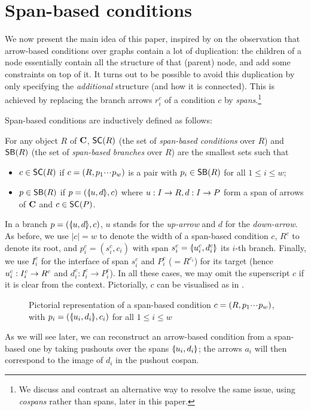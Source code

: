 \section{Span-based conditions}

We now present the main idea of this paper, inspired by on the observation that arrow-based conditions over graphs contain a lot of duplication: the children of a node essentially contain all the structure of that (parent) node, and add some constraints on top of it. It turns out to be possible to avoid this duplication by only specifying the \emph{additional} structure (and how it is connected). This is achieved by replacing the branch arrows $r^c_i$ of a condition $c$ by \emph{spans}.\footnote{We discuss and contrast an alternative way to resolve the same issue, using \emph{cospans} rather than spans, later in this paper.}

Span-based conditions are inductively defined as follows:

\begin{definition}
  For any object $R$ of $\mathbf{C}$, $\SC R$ (the set of \emph{span-based conditions} over $R$) and $\SB R$ (the set of \emph{span-based branches} over $R$) are the smallest sets such that
  \begin{itemize}
  \item $c\in \SC R$ if $c=(R,p_1{\cdotp\mkern-2mu\cdotp\mkern-2mu\cdotp\mkern1mu} p_w)$ is a pair with $p_i\in \SB R$ for all $1\leq i\leq w$;
  \item $p\in \SB R$ if $p=(\spanof u d,c)$ where $u: I\to R, d:I\rightarrow P$ form a span of arrows of $\mathbf{C}$ and $c\in \SC P$.
  \end{itemize}
\end{definition}
%
In a branch $p=(\spanof u d,c)$, $u$ stands for the \emph{up-arrow} and $d$ for the \emph{down-arrow}. As before, we use $|c|=w$ to denote the width of a span-based condition $c$, $R^c$ to denote its root, and $p^c_i=(s^c_i,c_i)$ with span $s^c_i=\spanof{u^c_i}{d^c_i}$ its $i$-th branch. Finally, we use $I^c_i$ for the interface of span $s^c_i$ and $P^c_i$ ($=R^{c_i}$) for its target (hence $u^c_i:I^c_i\rightarrow R^c$ and $d^c_i:I^c_i\rightarrow P^c_i$). In all these cases, we may omit the superscript $c$ if it is clear from the context. Pictorially, $c$ can be visualised as in .
%
\begin{figure}
  \centering
  
  \caption{Pictorial representation of a span-based condition $c=(R,p_1{\cdotp\mkern-2mu\cdotp\mkern-2mu\cdotp\mkern1mu} p_w)$, with $p_i=(\spanof{u_i}{d_i},c_i)$ for all $1\leq i\leq w$}
\end{figure}
%
As we will see later, we can reconstruct an arrow-based condition from a span-based one by taking pushouts over the spans $\spanof{u_i}{d_i}$; the arrows $a_i$ will then correspond to the image of $d_i$ in the pushout cospan.

